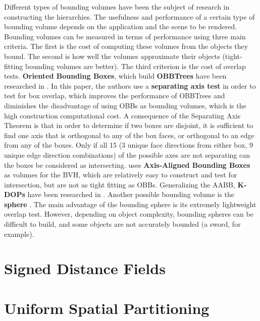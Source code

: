 Different types of bounding volumes have been the subject of research in constructing the hierarchies. The usefulness and performance of a certain type of bounding volume depends on the application and the scene to be rendered. Bounding volumes can be measured in terms of performance using three main criteria. The first is the cost of computing these volumes from the objects they bound. The second is how well the volumes approximate their objects (tight-fitting bounding volumes are better). The third criterion is the cost of overlap tests. \textbf{Oriented Bounding Boxes}, which build \textbf{OBBTrees} have been researched in \citep{gott96}. In this paper, the authors use a \textbf{separating axis test} in order to test for box overlap, which improves the performance of OBBTrees and diminishes the disadvantage of using OBBs as bounding volumes, which is the high construction computational cost. A consequence of the Separating Axis Theorem is that in order to determine if two boxes are disjoint, it is sufficient to find one axis that is orthogonal to any of the box faces, or orthogonal to an edge from any of the boxes. Only if all 15 (3 unique face directions from either box, 9 unique edge direction combinations) of the possible axes are not separating can the boxes be considered as intersecting. \citep{vdb97} uses \textbf{Axis-Aligned Bounding Boxes} as volumes for the BVH, which are relatively easy to construct and test for intersection, but are not as tight fitting as OBBs. Generalizing the AABB, \textbf{K-DOPs} have been researched in \citep{klo98}. Another possible bounding volume is the \textbf{sphere} \citep{hub96}. The main advantage of the bounding sphere is its extremely lightweight overlap test. However, depending on object complexity, bounding spheres can be difficult to build, and some objects are not accurately bounded (a sword, for example).



\section{Signed Distance Fields}
\label{sec:sdf}

\section{Uniform Spatial Partitioning}
\label{sec:usp}


